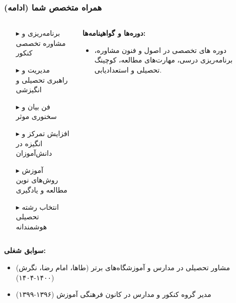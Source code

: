 \documentclass[aspectratio=169]{beamer}
\begin{document}
\begin{frame}[fragile]
  \frametitle{همراه متخصص شما (ادامه)}

  \vspace{-0.2cm} %
  \begin{columns}[T]
    \begin{column}{0.55\textwidth}
      \begin{itemize}\setlength{\itemsep}{0pt}
        \item[\textcolor{myblue}{$\blacktriangleright$}] برنامه‌ریزی و مشاوره تخصصی کنکور
        \item[\textcolor{myblue}{$\blacktriangleright$}] مدیریت و راهبری تحصیلی و انگیزشی
        \item[\textcolor{myblue}{$\blacktriangleright$}] فن بیان و سخنوری موثر
        \item[\textcolor{myblue}{$\blacktriangleright$}] افزایش تمرکز و انگیزه در دانش‌آموزان
        \item[\textcolor{myblue}{$\blacktriangleright$}] آموزش روش‌های نوین مطالعه و یادگیری
        \item[\textcolor{myblue}{$\blacktriangleright$}] انتخاب رشته تحصیلی هوشمندانه
      \end{itemize}
    \end{column}

    \begin{column}{0.4\textwidth}
      \begin{flushright}
        \textbf{دوره‌ها و گواهینامه‌ها:}
      \end{flushright}
      \begin{itemize}\setlength{\itemsep}{-1pt} %
        \item دوره های تخصصی در اصول و فنون مشاوره، برنامه‌ریزی درسی، مهارت‌های مطالعه، کوچینگ تحصیلی و استعدادیابی.
      \end{itemize}
    \end{column}
  \end{columns}

  \vspace{-0.1cm}
  \begin{flushright}
    \textbf{سوابق شغلی:}
  \end{flushright}
  \begin{itemize}\setlength{\itemsep}{-2pt} %
    \item مشاور تحصیلی در مدارس و آموزشگاه‌های برتر (طاها، امام رضا، نگرش) (۱۴۰۰-۱۴۰۴)
    \item مدیر گروه کنکور و مدارس در کانون فرهنگی آموزش (۱۳۹۶-۱۳۹۹)
  \end{itemize}

  \vspace{-0.3cm}
\end{frame}
\end{document}
